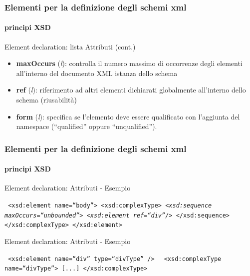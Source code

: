 \begin{frame}
	\frametitle{Elementi per la definizione degli schemi xml}
	\framesubtitle{principi XSD}
	\addtocounter{nframe}{1}

	\begin{block}{Element declaration: lista Attributi (cont.)}

		\begin{itemize}
			\item \textbf{maxOccurs} (\textit{l}): controlla il numero massimo di occorrenze degli elementi all'interno del documento XML istanza dello schema
			\item \textbf{ref} (\textit{l}): riferimento ad altri elementi dichiarati globalmente all'interno dello schema (riusabilità)
			\item \textbf{form} (\textit{l}): specifica se l'elemento deve essere qualificato con l'aggiunta del namespace (``qualified'' oppure ``unqualified'').
		\end{itemize}
	\end{block}

\end{frame}

\begin{frame}
	\frametitle{Elementi per la definizione degli schemi xml}
	\framesubtitle{principi XSD}
	\addtocounter{nframe}{1}

	\begin{block}{Element declaration: Attributi - Esempio }

		\texttt{
			<xsd:element name=``body''>
			<xsd:complexType>
			\emph{<xsd:sequence maxOccurs=``unbounded''>}
			\emph{<xsd:element ref=``div''/>}
			</xsd:sequence>
			</xsd:complexType>
			</xsd:element>
		}

	\end{block}


	\begin{block}{Element declaration: Attributi - Esempio }

		\texttt{
			<xsd:element name=``div'' type=``divType'' />
		}
		\texttt{
			<xsd:complexType name=``divType''>
			[...]
			</xsd:complexType>
		}

	\end{block}

\end{frame}




